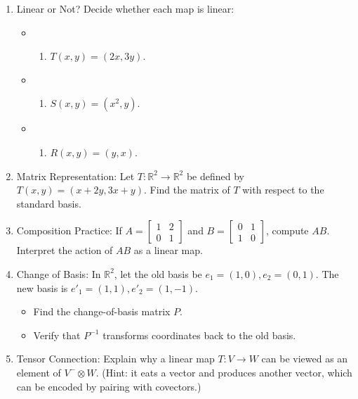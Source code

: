 \documentclass[
  letterpaper,
  DIV=11,
  numbers=noendperiod]{scrreprt}
\providecommand{\tightlist}{%
  \setlength{\itemsep}{0pt}\setlength{\parskip}{0pt}}
\begin{document}
\begin{enumerate}
\def\labelenumi{\arabic{enumi}.}
\item
  Linear or Not? Decide whether each map is linear:

  \begin{itemize}
  \tightlist
  \item
    \begin{enumerate}
    \def\labelenumii{(\alph{enumii})}
    \tightlist
    \item
      \(T(x,y) = (2x,3y)\).
    \end{enumerate}
  \item
    \begin{enumerate}
    \def\labelenumii{(\alph{enumii})}
    \setcounter{enumii}{1}
    \tightlist
    \item
      \(S(x,y) = (x^2,y)\).
    \end{enumerate}
  \item
    \begin{enumerate}
    \def\labelenumii{(\alph{enumii})}
    \setcounter{enumii}{2}
    \tightlist
    \item
      \(R(x,y) = (y,x)\).
    \end{enumerate}
  \end{itemize}
\item
  Matrix Representation: Let \(T:\mathbb{R}^2 \to \mathbb{R}^2\) be
  defined by \(T(x,y) = (x+2y,3x+y)\). Find the matrix of \(T\) with
  respect to the standard basis.
\item
  Composition Practice: If
  \(A = \begin{bmatrix}1 & 2\\0 & 1\end{bmatrix}\) and
  \(B = \begin{bmatrix}0 & 1\\1 & 0\end{bmatrix}\), compute \(AB\).
  Interpret the action of \(AB\) as a linear map.
\item
  Change of Basis: In \(\mathbb{R}^2\), let the old basis be
  \(e_1 = (1,0), e_2=(0,1)\). The new basis is
  \(e'_1=(1,1), e'_2=(1,-1)\).

  \begin{itemize}
  \tightlist
  \item
    Find the change-of-basis matrix \(P\).
  \item
    Verify that \(P^{-1}\) transforms coordinates back to the old basis.
  \end{itemize}
\item
  Tensor Connection: Explain why a linear map \(T: V \to W\) can be
  viewed as an element of \(V^- \otimes W\). (Hint: it eats a vector and
  produces another vector, which can be encoded by pairing with
  covectors.)
\end{enumerate}
\end{document}
